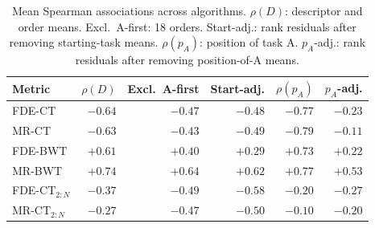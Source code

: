 \begin{table}[!t]
\centering
\caption{Mean Spearman associations across algorithms. $\rho(D)$: descriptor and order means. Excl.\ A-first: 18 orders. Start-adj.: rank residuals after removing starting-task means. $\rho(p_A)$: position of task A. $p_A$-adj.: rank residuals after removing position-of-A means.}
\label{tab:starting_correlations}
\setlength{\tabcolsep}{2.5pt}
\footnotesize
\begin{tabular*}{\columnwidth}{@{\extracolsep{\fill}}lrrrrr@{}}
\toprule
Metric & $\rho(D)$ & Excl.\ A-first & Start-adj. & $\rho(p_A)$ & $p_A$-adj. \\
\midrule
FDE-CT & $-0.64$ & $-0.47$ & $-0.48$ & $-0.77$ & $-0.23$ \\
MR-CT & $-0.63$ & $-0.43$ & $-0.49$ & $-0.79$ & $-0.11$ \\
FDE-BWT & $+0.61$ & $+0.40$ & $+0.29$ & $+0.73$ & $+0.22$ \\
MR-BWT & $+0.74$ & $+0.64$ & $+0.62$ & $+0.77$ & $+0.53$ \\
\midrule
FDE-CT$_{2:N}$ & $-0.37$ & $-0.49$ & $-0.58$ & $-0.20$ & $-0.27$ \\
MR-CT$_{2:N}$ & $-0.27$ & $-0.47$ & $-0.50$ & $-0.10$ & $-0.20$ \\
\bottomrule
\end{tabular*}
\end{table}
